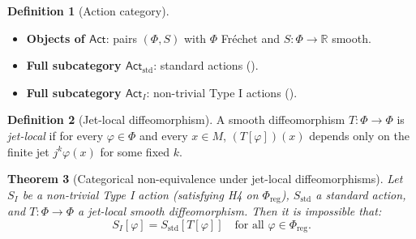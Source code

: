 \documentclass[12pt,letterpaper]{article}
\newtheorem{theorem}{Theorem}[section]
\theoremstyle{definition}
\newtheorem{definition}[theorem]{Definition}
\newcommand{\mPhi}{\Phi}
\newcommand{\mreg}{\mPhi_{\mathrm{reg}}}
\newcommand{\R}{\mathbb{R}}
\begin{document}
\begin{definition}[Action category]
\leavevmode
\begin{itemize}
\item \textbf{Objects of $\mathsf{Act}$}: pairs $(\mPhi, S)$ with $\mPhi$ Fr\'echet and $S: \mPhi \to \R$ smooth.
\item \textbf{Full subcategory $\mathsf{Act}_{\mathrm{std}}$}: standard actions ().
\item \textbf{Full subcategory $\mathsf{Act}_I$}: non-trivial Type I actions ().
\end{itemize}
\end{definition}

\begin{definition}[Jet-local diffeomorphism]
A smooth diffeomorphism $T: \mPhi \to \mPhi$ is \emph{jet-local} if for every $\varphi \in \mPhi$ and every $x \in M$, $(T[\varphi])(x)$ depends only on the finite jet $j^k\varphi(x)$ for some fixed $k$.
\end{definition}

\begin{theorem}[Categorical non-equivalence under jet-local diffeomorphisms]
\label{thm:p14d}
Let $S_I$ be a non-trivial Type I action (satisfying H4 on $\mreg$), $S_{\mathrm{std}}$ a standard action, and $T: \mPhi \to \mPhi$ a jet-local smooth diffeomorphism. Then it is \emph{impossible} that:
\[ S_I[\varphi] = S_{\mathrm{std}}[T[\varphi]] \quad \text{for all } \varphi \in \mreg. \]
\end{theorem}
\end{document}
